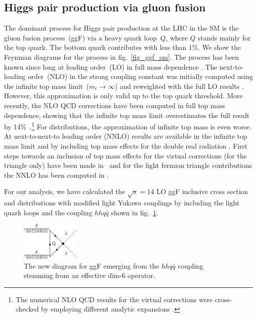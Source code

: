 \subsection{Higgs pair production via gluon fusion \label{sec:ggF}}
The dominant process for Higgs pair production at the LHC in the SM is the gluon fusion process~(ggF) via a heavy quark loop~$Q$, where $Q$ stands mainly  for the top quark. The bottom quark contributes with less than $1\%$. We show the Feynman diagrams for the process in  fig.~\ref{fig_ggf_sm}.
%
%
The process has been known since long at leading order~(LO) in full mass dependence \cite{EBOLI1987269,GLOVER1988282,DICUS1988457,Plehn:1996wb}. The next-to-leading order~(NLO) in the strong coupling constant was initially computed using the infinite top mass limit~($m_t \to \infty$) and reweighted with the full LO results \cite{Dawson:1998py}. However, this approximation is only valid up to the top quark threshold. More recently, the NLO QCD corrections have been computed in full top mass dependence, showing that the infinite top mass limit overestimates the full result by 14\%~\cite{Borowka:2016ypz,Borowka:2016ehy,Baglio:2018lrj}.\footnote{ The numerical NLO QCD results for the virtual corrections were cross-checked by employing different analytic expansions \cite{Bonciani:2018omm, Grober:2017uho, Davies:2018qvx}.} For distributions, the approximation of infinite top mass is even worse.  At next-to-next-to leading order (NNLO) results are available in the infinite top mass limit \cite{Grigo:2014jma, deFlorian:2013jea} and by including top mass effects for the double real radiation \cite{Grazzini:2018bsd}. First steps towards an inclusion of top mass effects for the virtual corrections (for the triangle only) have been made in~\cite{Davies:2019nhm, Davies:2019djw} and for the light fermion triangle contributions the NNLO has been computed in \cite{Harlander:2019ioe}.
%
\par
%
{}
For our analysis, we have calculated the $ \sqrt{s} = 14$   LO ggF inclusive cross section and distributions with modified light Yukawa couplings by including the light quark loops and the coupling $hh q \bar q$ shown in fig.~\ref{fig_ggf_diag}.
\begin{figure}[!hb]
	\centering
	\includegraphics[width = 0.25\textwidth]{./fig/ggfdim6}
	\caption{The new diagram for ggF emerging from the $hh q \bar q$ coupling stemming from an effective dim-6 operator.}
	\label{fig_ggf_diag}
\end{figure}
